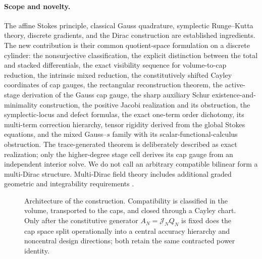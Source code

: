 \documentclass[11pt,a4paper]{article}
\begin{document}
\paragraph{Scope and novelty.}
The affine Stokes principle, classical Gauss quadrature, symplectic
Runge--Kutta theory, discrete gradients, and the Dirac construction are
established ingredients.  The new contribution is their common
quotient-space formulation on a discrete cylinder: the nonsurjective
classification, the explicit distinction between the total and stacked
differentials, the exact visibility sequence for volume-to-cap reduction,
the intrinsic mixed reduction, the constitutively shifted Cayley
coordinates of cap gauges, the
rectangular reconstruction theorem, the active-stage derivation of the
Gauss cap gauge, the sharp auxiliary Schur existence-and-minimality
construction, the
positive Jacobi realization and its obstruction, the symplectic-locus and defect formulas, the exact
one-term order dichotomy, its multi-term correction hierarchy, tensor
rigidity derived from the global Stokes equations, and the mixed
Gauss--\(s\) family with its scalar-functional-calculus obstruction.  The
trace-generated theorem is deliberately described as exact realization;
only the higher-degree stage cell derives its cap gauge from an
independent interior solve.  We do not call an
arbitrary compatible bilinear form a multi-Dirac structure.  Multi-Dirac
field theory includes additional graded geometric and integrability
requirements \cite{vankerschaver2012}.

\begin{figure}[t]
\centering
{}
\caption{Architecture of the construction.  Compatibility is classified
in the volume, transported to the caps, and closed through a Cayley chart.
Only after the constitutive generator \(A_N=\mathcal J_NQ_N\) is fixed
does the cap space split operationally into a central accuracy hierarchy
and noncentral design directions; both retain the same contracted power
identity.}
\label{fig:paper-architecture}
\end{figure}
\end{document}
